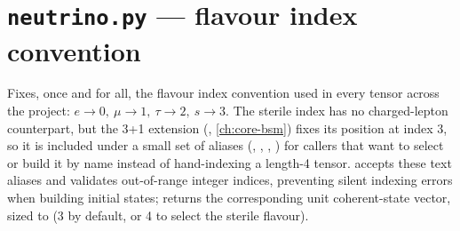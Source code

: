\section{\texttt{neutrino.py} --- flavour index convention}


\begin{implbox}
Fixes, once and for all, the flavour index convention used in every tensor
across the project: $e\to0,\ \mu\to1,\ \tau\to2,\ s\to3$. The sterile index
has no charged-lepton counterpart, but the 3+1 extension
(, \cref{ch:core-bsm}) fixes its position at index 3,
so it is included under a small set of aliases (, ,
, ) for callers that want to select or build it by
name instead of hand-indexing a length-4 tensor. 
accepts these text aliases and validates out-of-range integer indices,
preventing silent indexing errors when building initial states;
 returns the corresponding unit coherent-state
vector, sized to  (3 by default, or 4 to select the
sterile flavour).
\end{implbox}
